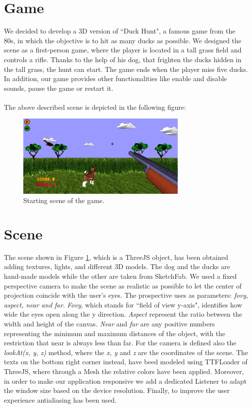 \documentclass[12pt,a4paper]{article}
\begin{document}
	\section{Game}\label{g}
	We decided to develop a 3D version of ``Duck Hunt", a  
	famous game from the 80s, in which the objective is to hit  
	as many ducks as possible. We designed the
	scene as a first-person game, where the player is located 
	in a tall grass field and controls a rifle. 
	Thanks to the help of his dog, that frighten the ducks hidden 
	in the tall grass, the hunt can start. 
	The game ends when the player miss five ducks.
	In addition, our game provides other functionalities like enable 
	and disable sounds, pause the game or restart it.
	\\ \\The above described scene is depicted in the following figure:
	\begin{figure}[hbt!]
		\centering
		\includegraphics[width=0.75\textwidth]{game.png}
		\caption{Starting scene of the game.}
		\label{fig1}
	\end{figure}
	\section{Scene}
	The scene shown in Figure \ref{fig1}, which is a ThreeJS object, 
	has been obtained adding textures, lights, and different 3D models. 
	The dog and the ducks are hand-made models while the other are 
	taken from SketchFab. We used a fixed perspective camera to make the 
	scene as realistic as possible to let the center of projection coincide 
	with the user’s eyes. 
	The prospective uses as parameters: \textit{fovy, aspect, near and 
		far}. \textit{Fovy}, which stands for ``field of view y-axis",
	identifies how wide the eyes open along the y direction.
	\textit{Aspect} represent the ratio between the width and height
	of the canvas.
	\textit{Near} and \textit{far} are any positive numbers 
	representing the minimum and maximum distances of the object, 
	with the restriction that near is always less than far.
	For the camera is defined also the  
	\textit{lookAt(x, y, z)} method, where the \textit{x, y} and \textit{z} 
	are the coordinates of the scene.
	The texts on the bottom right corner instead, have beed modeled using
	TTFLoader of ThreeJS, where through a Mesh the relative 
	colors have been applied.
	Moreover, in order to make our application responsive we add a 
	dedicated Listener to adapt the window size based on the device
	resolution. Finally, to improve the user experience antialiasing 
	has been used.
\end{document}
